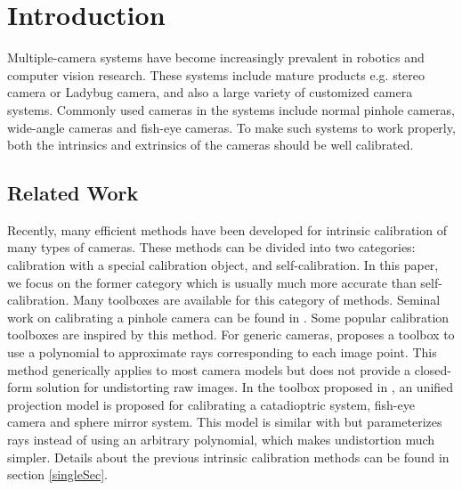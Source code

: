 \documentclass{report}
\begin{document}
\chapter{Introduction}
Multiple-camera systems have become increasingly prevalent in robotics and computer vision research. These systems include mature products e.g. stereo camera or Ladybug camera, and also a large variety of customized camera systems. Commonly used cameras in the systems include normal pinhole cameras, wide-angle cameras and fish-eye cameras. To make such systems to work properly, both the intrinsics and extrinsics of the cameras should be well calibrated. 

\section{Related Work}
Recently, many efficient methods have been developed for intrinsic calibration of many types of cameras. These methods can be divided into two categories: calibration with a special calibration object, and self-calibration. In this paper, we focus on the former category which is usually much more accurate than self-calibration. Many toolboxes are available for this category of methods. Seminal work on calibrating a pinhole camera can be found in \cite{zhang2000flexible}. Some popular calibration toolboxes \cite{bouguet2004camera,stoyanov2006camera, opencv_library} are inspired by this method. For generic cameras, \cite{scaramuzza2006toolbox} proposes a toolbox to use a polynomial to approximate rays corresponding to each image point. This method generically applies to most camera models but does not provide a closed-form solution for undistorting raw images. In the toolbox proposed in \cite{mei2007single}, an unified projection model is proposed for calibrating a catadioptric system, fish-eye camera and sphere mirror system. This model is similar with \cite{scaramuzza2006toolbox} but parameterizes rays instead of using an arbitrary polynomial, which makes undistortion much simpler. Details about the previous intrinsic calibration methods can be found in section \ref{singleSec}. 
\end{document}
